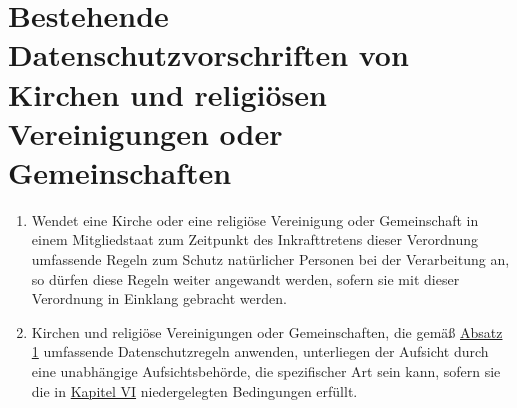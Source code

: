 \chapter{Bestehende Datenschutzvorschriften von Kirchen und religiösen Vereinigungen oder Gemeinschaften}
\label{ch:91}


\begin{enumerate}

  \item Wendet eine Kirche oder eine religiöse Vereinigung oder Gemeinschaft in einem Mitgliedstaat zum Zeitpunkt des
   Inkrafttretens dieser Verordnung umfassende Regeln zum Schutz natürlicher Personen bei der Verarbeitung an, so
   dürfen diese Regeln weiter angewandt werden, sofern sie mit dieser Verordnung in Einklang gebracht werden.
  \label{itm:91-1}

  \item Kirchen und religiöse Vereinigungen oder Gemeinschaften, die gemäß \hyperref[itm:91-1]{Absatz 1} umfassende
   Datenschutzregeln anwenden, unterliegen der Aufsicht durch eine unabhängige Aufsichtsbehörde, die spezifischer Art
   sein kann, sofern sie die in \hyperref[part:6]{Kapitel VI} niedergelegten Bedingungen erfüllt.
  \label{itm:91-2}
   
\end{enumerate}


